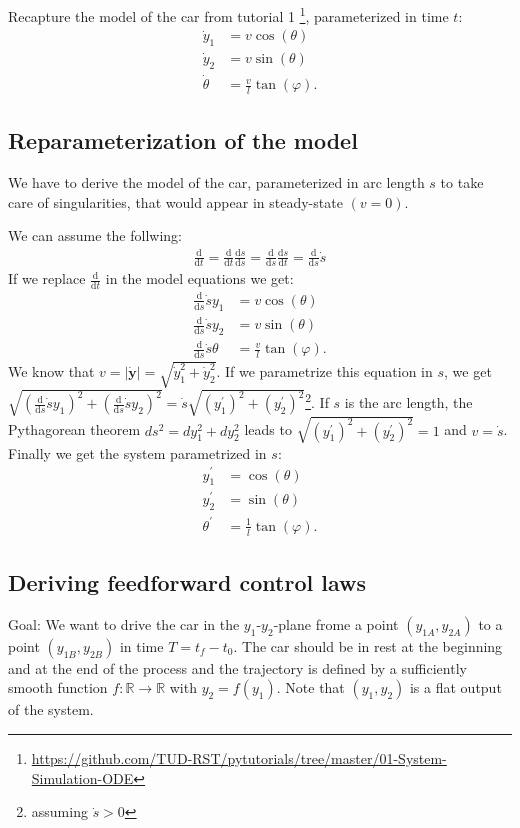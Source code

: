 \documentclass[a4paper,11pt,headings=standardclasses,parskip=half]{scrartcl}
\newcommand{\yIZ}{y_{1A}}
\newcommand{\yIIZ}{y_{2A}}
\newcommand{\yIT}{y_{1B}}
\newcommand{\yIIT}{y_{2B}}
\renewcommand{\d}{\mathrm{d}} %
\begin{document}
Recapture the model of the car from tutorial 1 \footnote{\url{https://github.com/TUD-RST/pytutorials/tree/master/01-System-Simulation-ODE}}, parameterized in time $t$:
\begin{subequations}
\begin{align}
\dot y_1 &= v \cos(\theta)\\
\dot y_2 &= v \sin(\theta)\\
\dot \theta &= \frac{v}{l}\tan(\varphi).
\end{align}
\end{subequations}
\subsection{Reparameterization of the model}
We have to derive the model of the car, parameterized in arc length $s$ to take care of singularities, that would appear in steady-state $(v=0)$.

We can assume the follwing:
\begin{align*}
\frac{\d}{\d t} = \frac{\d}{\d t}\frac{\d s}{\d s} = \frac{\d}{\d s}\frac{\d s}{\d t} = \frac{\d}{\d s}\dot s
\end{align*}
If we replace $\frac{\d}{\d t}$ in the model equations we get:
\begin{subequations}
\begin{align}
\frac{\d}{\d s}\dot s y_1 &= v \cos(\theta)\\
\frac{\d}{\d s}\dot s y_2 &= v \sin(\theta)\\
\frac{\d}{\d s}\dot s \theta &= \frac{v}{l}\tan(\varphi).
\end{align}
\end{subequations}
We know that $v = |\dot{\bm{y}}| = \sqrt{\dot y_1^2+\dot y_2^2}$. If we parametrize this equation in $s$, we get   $\sqrt{(\frac{\d}{\d s}\dot sy_1)^2+(\frac{\d}{\d s}\dot s y_2)^2}=\dot s \sqrt{(y_1^\prime)^2+(y_2^\prime)^2}$\footnote{assuming $\dot s > 0$}. If $s$ is the arc length, the Pythagorean theorem $ds^2 = dy_1^2 + dy_2^2$ leads to $\sqrt{(y_1^\prime)^2+(y_2^\prime)^2}=1$ and $v=\dot s$. 
Finally we get the system parametrized in $s$:
\begin{subequations}
\begin{align}
y_1^\prime &= \cos(\theta)\\
y_2^\prime &= \sin(\theta)\\
\theta^\prime &= \frac{1}{l}\tan(\varphi).
\end{align}
\end{subequations}
\subsection{Deriving feedforward control laws}
Goal: We want to drive the car in the $y_1$-$y_2$-plane frome a point $(\yIZ, \yIIZ)$ to a point $(\yIT, \yIIT)$ in time $T=t_f-t_0$. The car should be in rest at the beginning and at the end of the process and the trajectory is defined by a sufficiently smooth function $f : \mathbb{R} \to \mathbb{R}$ with $y_2 = f(y_1)$. Note that $(y_1, y_2)$ is a flat output of the system.
\end{document}
